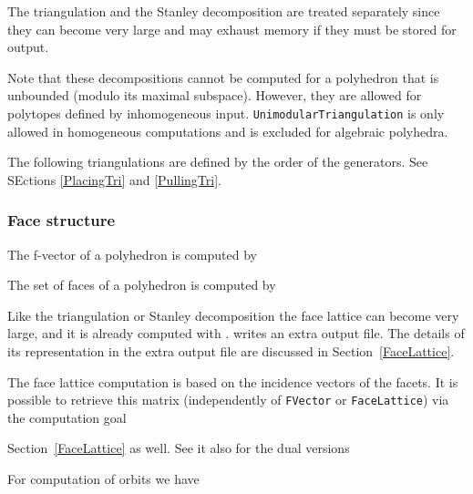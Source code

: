 The triangulation and the Stanley decomposition are treated
separately since they can become very large and may exhaust
memory if they must be stored for output.

Note that these decompositions cannot be computed for a polyhedron that is unbounded (modulo its maximal subspace). However, they are allowed for polytopes defined by inhomogeneous input. \verb|UnimodularTriangulation| is only allowed in homogeneous computations and is excluded for algebraic polyhedra.

The following triangulations are defined by the order of the generators. See SEctions \ref{PlacingTri} and \ref{PullingTri}.
\begin{itemize}
	\itemtt[PlacingTriangulation]
	\itemtt[PullingTriangulation]
\end{itemize}

\subsubsection{Face structure}

The f-vector of a polyhedron is computed by
\begin{itemize}
	\itemtt[FVector]
\end{itemize}

The set of faces of a polyhedron is computed by
\begin{itemize}
	\itemtt[FaceLattice]
\end{itemize}
Like the triangulation or Stanley decomposition the face lattice can become very large, and it is already computed with .  writes an extra output file. The details of its representation in the extra output file are discussed in Section~\ref{FaceLattice}.

The face lattice computation is based on the incidence vectors of the facets. It is possible to retrieve this matrix (independently of \verb|FVector| or \verb|FaceLattice|) via the computation goal
\begin{itemize}
	\itemtt[Incidence]
\end{itemize}
Section~\ref{FaceLattice} as well. See it also for the dual versions
\begin{itemize}
	\itemtt[DualFVector]
	\itemtt[DualFaceLattice]
	\itemtt[DualIncidence]
\end{itemize}

For computation of orbits we have

\begin{itemize}
	\itemtt[FVectorOrbits]
	\itemtt[FaceLatticeOrbits]
	\itemtt[DualFVectorOrbits]
	\itemtt[DualFaceLatticeOrbits]
\end{itemize}


